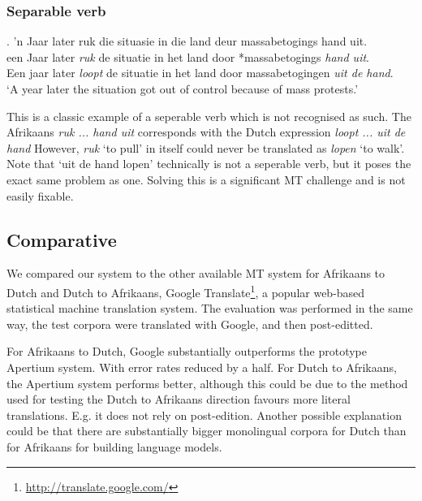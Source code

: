 \documentclass[11pt]{article}
\begin{document}
\subsubsection{Separable verb}

\ex. \label{ex:exsepverb} 
    'n Jaar later ruk die situasie in die land deur massabetogings hand uit. \\
    een Jaar later {\em *ruk} de situatie in het land door *massabetogings {\em hand uit}. \\
    Een jaar later {\em loopt} de situatie in het land door massabetogingen {\em uit de hand}. \\
    `A year later the situation got out of control because of mass protests.'

This is a classic example of a seperable verb which is not recognised as such. The 
Afrikaans \emph{ruk ... hand uit} corresponds with the Dutch expression
\emph{loopt ... uit de hand} However, \emph{ruk} `to pull' in itself 
could never be translated as \emph{lopen} `to walk'. Note that `uit de hand lopen' 
 technically is not a seperable verb, but it poses the exact same problem as one.
Solving this is a significant MT challenge and is not easily fixable.  

\subsection{Comparative}

We compared our system to the other available MT system for Afrikaans to Dutch and Dutch to Afrikaans, 
Google Translate\footnote{\url{http://translate.google.com/}}, a popular web-based statistical machine
translation system. The evaluation was performed in the same way, the test corpora were translated with 
Google, and then post-editted.

For Afrikaans to Dutch, Google substantially outperforms the prototype Apertium system. With error rates 
reduced by a half. For Dutch to Afrikaans, the Apertium system performs better, although this could 
be due to the method used for testing the Dutch to Afrikaans direction favours more literal translations. E.g. 
it does not rely on post-edition. Another possible explanation could be that there are substantially bigger
monolingual corpora for Dutch than for Afrikaans for building language models.

\end{document}
